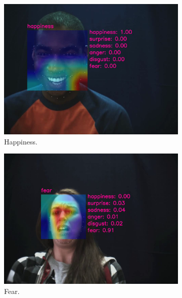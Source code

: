 \begin{figure}[ht]
  \centering
  \begin{subfigure}{0.49\linewidth} %
    \includegraphics[width=\linewidth]{GiMeFive01.png}
    \caption{Happiness.}
    \label{fig:v1}
  \end{subfigure}
  \hfill
  \begin{subfigure}{0.49\linewidth}
    \includegraphics[width=\linewidth]{GiMeFive02.png}
    \caption{Fear.}
    \label{fig:v2}
  \end{subfigure}
  \hfill
  \begin{subfigure}{0.49\linewidth}

\end{subfigure}
\end{figure}
